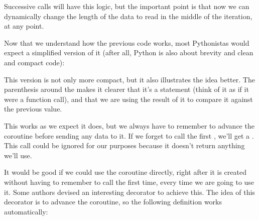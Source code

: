 \documentclass[a4paper,10pt,english]{sphinxmanual}
\begin{document}
Successive calls will have this logic, but the important point is that now we can
dynamically change the length of the data to read in the middle of the iteration, at any
point.

Now that we understand how the previous code works, most Pythonistas would expect a
simplified version of it (after all, Python is also about brevity and clean and compact code):

\begin{sphinxVerbatim}[commandchars=\\\{\}]
 
      
      
         
                 
              
     
\end{sphinxVerbatim}

This version is not only more compact, but it also illustrates the idea better. The parenthesis
around the  makes it clearer that it’s a statement (think of it as if it were a function
call), and that we are using the result of it to compare it against the previous value.

This works as we expect it does, but we always have to remember to advance the coroutine
before sending any data to it. If we forget to call the first , we’ll get a .
This call could be ignored for our purposes because it doesn’t return anything we’ll use.

It would be good if we could use the coroutine directly, right after it is created without
having to remember to call  the first time, every time we are going to use it. Some
authors devised an interesting decorator to achieve this. The idea of this
decorator is to advance the coroutine, so the following definition works automatically:
\end{document}
